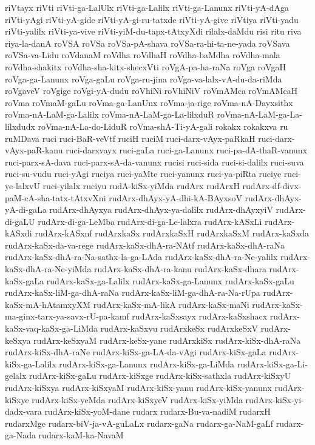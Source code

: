 {riVtayx
riVti
riVti-ga-LalUlx
riVti-ga-Lalilx
riVti-ga-Lanunx
riVti-yA-dAga
riVti-yAgi
riVti-yA-gide
riVti-yA-gi-ru-tatxde
riVti-yA-give
riVtiya
riVti-yadu
riVti-yalilx
riVti-ya-vive
riVti-yiM-du-tapx-tAtxyXdi
rilalx-daMdu
risi
ritu
riva
riya-la-danA
roVSA
roVSa
roVSa-pA-shava
roVSa-ra-hi-ta-ne-yada
roVSava
roVSa-va-Lidu
roVdanaM
roVdha
roVdhaH
roVdha-baMdha
roVdha-mala
roVdha-shakitx
roVdha-sha-kitx-shecxVti
roVgA-pa-ha-raNa
roVga
roVgaH
roVga-ga-Lanunx
roVga-gaLu
roVga-ru-jina
roVga-va-lalx-vA-du-da-riMda
roVgaveV
roVgige
roVgi-yA-dudu
roVhiNi
roVhiNiV
roVmAMca
roVmAMcaH
roVma
roVmaM-gaLu
roVma-ga-LanUnx
roVma-ja-rige
roVma-nA-Dayxsithx
roVma-nA-LaM-ga-Lalilx
roVma-nA-LaM-ga-La-lilxduR
roVma-nA-LaM-ga-La-lilxdudx
roVma-nA-La-do-LiduR
roVma-shA-Ti-yA-gali
rokakx
rokakxva
ru
ruMDava
ruci
ruci-BaR-veVtf
ruciH
ruciM
ruci-darx-vAyx-paRkaH
ruci-darx-vAyx-paR-kanu
ruci-darxvayx
ruci-gaLa
ruci-ga-Lanunx
ruci-pa-dA-thaR-vanunx
ruci-parx-sA-dava
ruci-parx-sA-da-vanunx
rucisi
ruci-sida
ruci-si-dalilx
ruci-suva
ruci-su-vudu
ruci-yAgi
ruciya
ruci-yaMte
ruci-yanunx
ruci-ya-piRta
ruciye
ruci-ye-lalxvU
ruci-yilalx
ruciyu
rudA-kiSx-yiMda
rudArx
rudArxH
rudArx-df-divx-paM-cA-sha-tatx-tAtxvXni
rudArx-dhAyx-yA-dhi-kA-BAyxsoV
rudArx-dhAyx-yA-di-gaLa
rudArx-dhAyxya
rudArx-dhAyx-ya-dalilx
rudArx-dhAyxyiV
rudArx-di-gaLU
rudArx-di-ga-LeMba
rudArx-di-ga-Le-lalxra
rudArx-kASxLi
rudArx-kASxdi
rudArx-kASxnf
rudArxkaSx
rudArxkaSxH
rudArxkaSxM
rudArx-kaSxda
rudArx-kaSx-da-va-rege
rudArx-kaSx-dhA-ra-NAtf
rudArx-kaSx-dhA-raNa
rudArx-kaSx-dhA-ra-Na-sathx-la-ga-LAda
rudArx-kaSx-dhA-ra-Ne-yalilx
rudArx-kaSx-dhA-ra-Ne-yiMda
rudArx-kaSx-dhA-ra-kanu
rudArx-kaSx-dhara
rudArx-kaSx-gaLa
rudArx-kaSx-ga-Lalilx
rudArx-kaSx-ga-Lanunx
rudArx-kaSx-gaLu
rudArx-kaSx-liM-ga-dhA-raNa
rudArx-kaSx-liM-ga-dhA-ra-Na-rUpa
rudArx-kaSx-mA-hAtamxyXM
rudArx-kaSx-mA-likA
rudArx-kaSx-maNi
rudArx-kaSx-ma-ginx-tarx-ya-savx-rU-pa-kamf
rudArx-kaSxsayx
rudArx-kaSxshacx
rudArx-kaSx-vaq-kaSx-ga-LiMda
rudArx-kaSxvu
rudArxkeSx
rudArxkeSxV
rudArx-keSxya
rudArx-keSxyaM
rudArx-keSx-yane
rudArxkiSx
rudArx-kiSx-dhA-raNa
rudArx-kiSx-dhA-raNe
rudArx-kiSx-ga-LA-da-vAgi
rudArx-kiSx-gaLa
rudArx-kiSx-ga-Lalilx
rudArx-kiSx-ga-Lanunx
rudArx-kiSx-ga-LiMda
rudArx-kiSx-ga-Li-gelalx
rudArx-kiSx-gaLu
rudArx-kiSxge
rudArx-kiSx-sathxla
rudArx-kiSxyU
rudArx-kiSxya
rudArx-kiSxyaM
rudArx-kiSx-yanu
rudArx-kiSx-yanunx
rudArx-kiSxye
rudArx-kiSx-yeMda
rudArx-kiSxyeV
rudArx-kiSx-yiMda
rudArx-kiSx-yi-dadx-vara
rudArx-kiSx-yoM-dane
rudarx
rudarx-Bu-va-nadiM
rudarxH
rudarxMge
rudarx-biV-ja-vA-guLaLx
rudarx-gaNa
rudarx-ga-NaM-gaLf
rudarx-ga-Nada
rudarx-kaM-ka-NavaM
}
